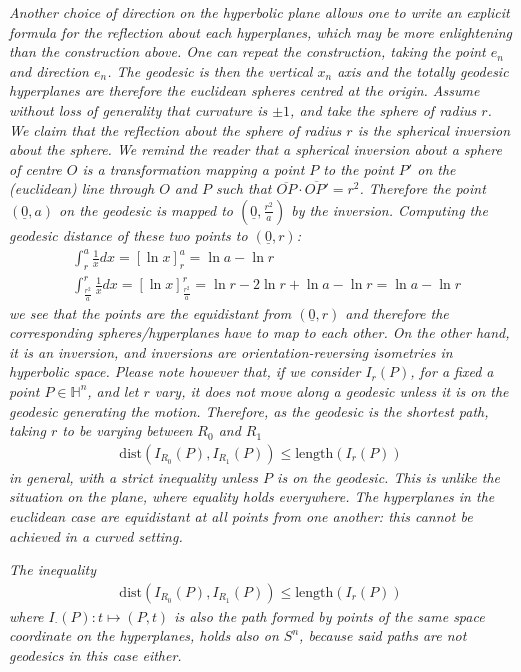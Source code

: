 \begin{oss}\label{inequality1}
	\em Another choice of direction on the hyperbolic plane allows one to write an explicit formula for the reflection about each hyperplanes, which may be more enlightening than the construction above. One can repeat the construction, taking the point $e_n$ and direction $e_n$. The geodesic is then the vertical $x_n$ axis and the totally geodesic hyperplanes are therefore the euclidean spheres centred at the origin. Assume without loss of generality that curvature is $\pm 1$, and take the sphere of radius $r$. We claim that the reflection about the sphere of radius $r$ is the spherical inversion about the sphere. We remind the reader that a spherical inversion about a sphere of centre $O$ is a transformation mapping a point $P$ to the point $P'$ on the (euclidean) line through $O$ and $P$ such that $\overline{OP}\cdot \overline{OP'} = r^2$. Therefore the point $(\underline{0}, a)$ on the geodesic is mapped to $(\underline{0}, \frac{r^2}{a})$ by the inversion. Computing the geodesic distance of these two points to  $(\underline{0}, r)$:
	\begin{align*}
		&\int_{r}^{a} \frac{1}{x} dx = \left[\ln{x} \right]_{r}^{a} = \ln{a} - \ln{r} \\
		&\int_{\frac{r^2}{a}}^{r} \frac{1}{x} dx = \left[\ln{x} \right]_{\frac{r^2}{a}}^{r} = \ln{r} - 2 \ln{r} + \ln{a} - \ln{ r} = \ln{a} - \ln{r}
	\end{align*}
	we see that the points are the equidistant from $(\underline{0}, r)$ and therefore the corresponding spheres/hyperplanes have to map to each other. On the other hand, it is an inversion, and inversions are orientation-reversing isometries in hyperbolic space. Please note however that, if we consider $I_r(P)$, for a fixed a point $P\in \mathbb{H}^n$, and let $r$ vary, it does not move along a geodesic unless it is on the geodesic generating the motion. Therefore, as the geodesic is the shortest path, taking $r$ to be varying between $R_0$ and $R_1$
	\begin{align*}
		\mathrm{dist}(I_{R_0}(P), I_{R_1}(P)) \leq \mathrm{length} (I_r(P))
	\end{align*}
	in general, with a strict inequality unless $P$ is on the geodesic. This is unlike the situation on the plane, where equality holds everywhere. 
	The hyperplanes in the euclidean case are equidistant at all points from one another: this cannot be achieved in a curved setting. 
\end{oss}
\begin{oss}\label{inequality2}\em 
	The inequality
	\begin{align}
		\mathrm{dist}(I_{R_0}(P), I_{R_1}(P)) \leq \mathrm{length} (I_r(P))
	\end{align}
	where $I_\cdot(P): t \mapsto (P,t)$ is also the path formed by points of the same space coordinate on the hyperplanes, holds also on $S^n$, because said paths are not geodesics in this case either. 
\end{oss}

